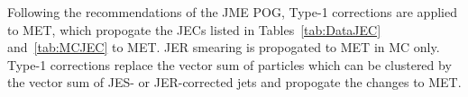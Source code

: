 Following the recommendations of the JME POG, Type-1 corrections are applied to MET, which propogate the JECs listed in Tables~\ref{tab:DataJEC} and~\ref{tab:MCJEC} to MET. JER smearing is propogated to MET in MC only. Type-1 corrections replace the vector \pt sum of particles which can be clustered by the vector \pt sum of JES- or JER-corrected jets and propogate the changes to MET.